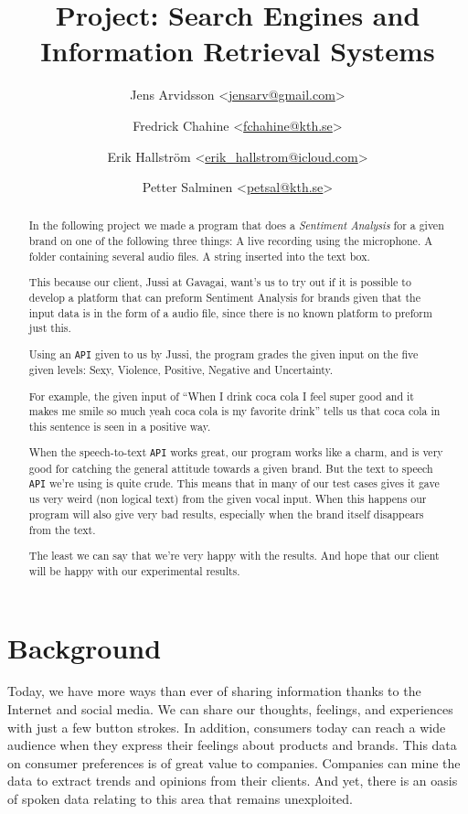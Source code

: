 \documentclass[a4paper,12pt,twoside]{ltxdoc}
\title{Project: Search Engines and Information Retrieval Systems}
\author{
Jens Arvidsson <\href{mailto:jensarv@gmail.com}{jensarv@gmail.com}> \and
Fredrick Chahine <\href{mailto:fchahine@kth.se}{fchahine@kth.se}> \and
Erik Hallström  <\href{mailto:erik_hallstrom@icloud.com}{erik\_hallstrom@icloud.com}> \and
Petter Salminen <\href{mailto:petsal@kth.se}{petsal@kth.se}>}
\begin{document}
\maketitle
\tableofcontents

\newpage
\begin{abstract}
In the following project we made a program that does a \emph{Sentiment Analysis} for a given brand on one of the following three things: A live recording using the microphone. A folder containing several audio files. A string inserted into the text box.

This because our client, Jussi at Gavagai, want's us to try out if it is possible to develop a platform that can preform Sentiment Analysis for brands given that the input data is in the form of a audio file, since there is no known platform to preform just this. 

Using an \verb#API# given to us by Jussi, the program grades the given input on the five given levels: Sexy, Violence, Positive, Negative and Uncertainty. 

For example, the given input of ``When I drink coca cola I feel super good and it makes me smile so much yeah coca cola is my favorite drink'' tells us that coca cola in this sentence is seen in a positive way. 

When the speech-to-text \verb#API# works great, our program works like a charm, and is very good for catching the general attitude towards a given brand. But the text to speech \verb#API# we're using is quite crude. This means that in many of our test cases gives it gave us very weird (non logical text) from the given vocal input. When this happens our program will also give very bad results, especially when the brand itself disappears from the text.

The least we can say that we're very happy with the results. And hope that our client will be happy with our experimental results.
\end{abstract}

\newpage
\section{Background}
Today, we have more ways than ever of sharing information thanks to the Internet and social media. We can share our
thoughts, feelings, and experiences with just a few button strokes. In addition, consumers today can reach a wide audience
when they express their feelings about products and brands. This data on consumer preferences is of great value to companies.
Companies can mine the data to extract trends and opinions from their clients. And yet, there is an oasis of spoken
data relating to this area that remains unexploited.
\end{document}
